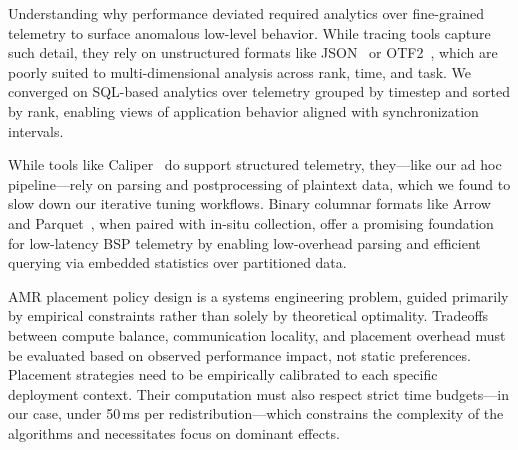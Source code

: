 
\noindent Understanding why performance deviated required analytics over fine-grained telemetry to surface
anomalous low-level behavior.
While tracing tools capture such detail, they rely on unstructured formats like
JSON~\cite{Googl:TraceEventFmt} or OTF2~\cite{Eschw2012:OTF2}, which are poorly suited to
multi-dimensional analysis across rank, time, and task.
We converged on SQL-based analytics over telemetry grouped by timestep and sorted by rank, enabling
views of application behavior aligned with synchronization intervals.

While tools like Caliper~\cite{Boehm2016:Caliper} do support structured telemetry, they---like our
ad hoc pipeline---rely on parsing and postprocessing of plaintext data, which we found to slow down
our iterative tuning workflows.
Binary columnar formats like Arrow~\cite{:ApacheArrow} and Parquet~\cite{:ApacheParquet}, when
paired with in-situ collection, offer a promising foundation for low-latency BSP telemetry by
enabling low-overhead parsing and efficient querying via embedded statistics over partitioned data.


\noindent AMR placement policy design is a systems engineering problem, guided primarily by empirical
constraints rather than solely by theoretical optimality.
Tradeoffs between compute balance, communication locality, and placement overhead must be evaluated
based on observed performance impact, not static preferences.
Placement strategies need to be empirically calibrated to each specific deployment context.
Their computation must also respect strict time budgets---in our case, under 50\,ms per
redistribution---which constrains the complexity of the algorithms and necessitates focus on
dominant effects.
